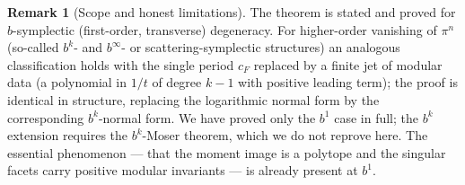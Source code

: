 \documentclass{amsart}
\theoremstyle{definition}
\newtheorem{remark}{Remark}
\begin{document}
\begin{remark}[Scope and honest limitations]
The theorem is stated and proved for $b$-symplectic (first-order, transverse)
degeneracy. For higher-order vanishing of $\pi^n$ (so-called $b^k$- and
$b^{\infty}$- or scattering-symplectic structures) an analogous classification
holds with the single period $c_F$ replaced by a finite jet of modular data
(a polynomial in $1/t$ of degree $k-1$ with positive leading term); the proof
is identical in structure, replacing the logarithmic normal form by the
corresponding $b^k$-normal form. We have proved only the $b^1$ case in full;
the $b^k$ extension requires the $b^k$-Moser theorem, which we do not reprove
here. The essential phenomenon --- that the moment image is a polytope and the
singular facets carry positive modular invariants --- is already present at
$b^1$.
\end{remark}
\end{document}
